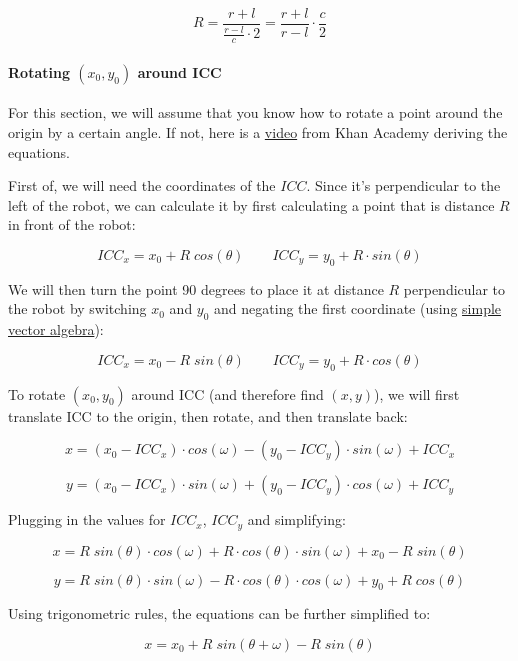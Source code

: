 \documentclass[12pt,twoside]{article}
\let\subsubsubsection\paragraph
\begin{document}
\vspace{-\parskip}\[R = \frac{r+l}{\frac{r - l}{c} \cdot 2} = \frac{r+l}{r - l} \cdot \frac{c}{2}\]


\subsubsubsection{Rotating $(x_0, y_0)$ around ICC}
For this section, we will assume that you know how to rotate a point around the origin by a certain angle. If not, here is a \href{https://www.khanacademy.org/partner-content/pixar/sets/rotation/v/sets-8}{video} from Khan Academy deriving the equations.

First of, we will need the coordinates of the $ICC$. Since it's perpendicular to the left of the robot, we can calculate it by first calculating a point that is distance $R$ in front of the robot:

\vspace{-\parskip}\[ICC_x=x_0+R \; cos(\theta) \qquad ICC_y=y_0+R \cdot sin(\theta)\]

We will then turn the point 90 degrees to place it at distance $R$ perpendicular to the robot by switching $x_0$ and $y_0$ and negating the first coordinate (using \href{https://stackoverflow.com/questions/4780119/2d-euclidean-vector-rotations}{simple vector algebra}):

\vspace{-\parskip}\[ICC_x=x_0-R \; sin(\theta) \qquad ICC_y=y_0+R \cdot cos(\theta)\]

To rotate $(x_0, y_0)$ around ICC (and therefore find $(x, y)$), we will first translate ICC to the origin, then rotate, and then translate back:

\vspace{-\parskip}\[x = (x_0 - ICC_x) \cdot cos(\omega) - (y_0 - ICC_y) \cdot sin(\omega) + ICC_x\]

\vspace{-\parskip}\[y = (x_0 - ICC_x) \cdot sin(\omega) + (y_0 - ICC_y) \cdot cos(\omega) + ICC_y\]

Plugging in the values for $ICC_x$, $ICC_y$ and simplifying:

\vspace{-\parskip}\[x = R \; sin(\theta) \cdot cos(\omega) + R \cdot cos(\theta) \cdot sin(\omega) + x_0 - R \; sin(\theta)\]

\vspace{-\parskip}\[y = R \; sin(\theta) \cdot sin(\omega) - R \cdot cos(\theta) \cdot cos(\omega) + y_0 + R \; cos(\theta)\]

Using trigonometric rules, the equations can be further simplified to:

\vspace{-\parskip}\[x = x_0 + R \; sin(\theta + \omega) - R \; sin(\theta)\]
\end{document}
